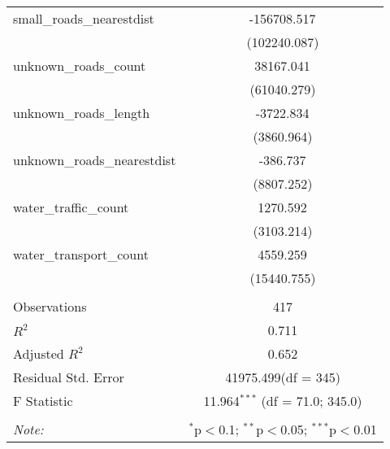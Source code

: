 \begin{table}[!htbp]
\begin{tabular}{@{\extracolsep{5pt}}lc}
 small_roads_nearestdist & -156708.517$^{}$ \\
  & (102240.087) \\
 unknown_roads_count & 38167.041$^{}$ \\
  & (61040.279) \\
 unknown_roads_length & -3722.834$^{}$ \\
  & (3860.964) \\
 unknown_roads_nearestdist & -386.737$^{}$ \\
  & (8807.252) \\
 water_traffic_count & 1270.592$^{}$ \\
  & (3103.214) \\
 water_transport_count & 4559.259$^{}$ \\
  & (15440.755) \\
\hline \\[-1.8ex]
 Observations & 417 \\
 $R^2$ & 0.711 \\
 Adjusted $R^2$ & 0.652 \\
 Residual Std. Error & 41975.499(df = 345)  \\
 F Statistic & 11.964$^{***}$ (df = 71.0; 345.0) \\
\hline
\hline \\[-1.8ex]
\textit{Note:} & \multicolumn{1}{r}{$^{*}$p$<$0.1; $^{**}$p$<$0.05; $^{***}$p$<$0.01} \\
\end{tabular}
\end{table}